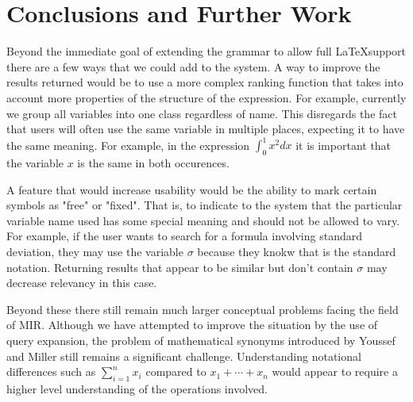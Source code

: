 \documentclass{sig-alternate}
\begin{document}
\section{Conclusions and Further Work}
Beyond the immediate goal of extending the grammar to allow full \LaTeX support there are a few ways that we could 
add to the system. A way to improve the results returned would be to use a more complex ranking function that takes into
account more properties of the structure of the expression. For example, currently we group all variables into one
class regardless of name. This disregards the fact that users will often use the same variable in multiple places, 
expecting it to have the same meaning. For example, in the expression $\int_{0}^{1}x^{2} dx$ it is important that
the variable $x$ is the same in both occurences. 

A feature that would increase usability would be the ability to mark certain symbols as "free" or "fixed". That is, to
indicate to the system that the particular variable name used has some special meaning and should not be allowed
to vary. For example, if the user wants to search for a formula involving standard deviation, they may use the
variable $\sigma$ because they knokw that is the standard notation. Returning results that appear to be similar but don't
contain $\sigma$ may decrease relevancy in this case.

Beyond these there still remain much larger conceptual problems facing the field of MIR. Although we have attempted to
improve the situation by the use of query expansion, the problem of mathematical synonyms introduced by Youssef and Miller still remains a significant challenge. Understanding notational differences such as $\sum_{i=1}^{n}x_i$ compared to
$x_1 + \cdots + x_n$ would appear to require a higher level understanding of the operations involved. 

%

\end{document}
